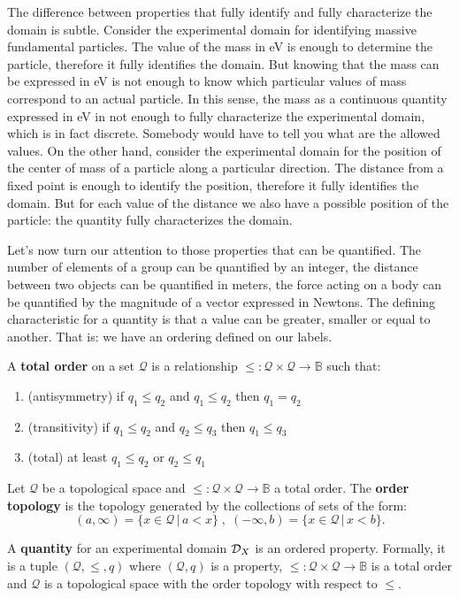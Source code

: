 \documentclass[11pt,letterpaper,fleqn]{memoir} %
\begin{document}
The difference between properties that fully identify and fully characterize the domain is subtle. Consider the experimental domain for identifying massive fundamental particles. The value of the mass in eV is enough to determine the particle, therefore it fully identifies the domain. But knowing that the mass can be expressed in eV is not enough to know which particular values of mass correspond to an actual particle. In this sense, the mass as a continuous quantity expressed in eV in not enough to fully characterize the experimental domain, which is in fact discrete. Somebody would have to tell you what are the allowed values. On the other hand, consider the experimental domain for the position of the center of mass of a particle along a particular direction. The distance from a fixed point is enough to identify the position, therefore it fully identifies the domain. But for each value of the distance we also have a possible position of the particle: the quantity fully characterizes the domain.

Let's now turn our attention to those properties that can be quantified. The number of elements of a group can be quantified by an integer, the distance between two objects can be quantified in meters, the force acting on a body can be quantified by the magnitude of a vector expressed in Newtons. The defining characteristic for a quantity is that a value can be greater, smaller or equal to another. That is: we have an ordering defined on our labels.
	
\begin{mathSection}
	\begin{defn}
		A \textbf{total order} on a set $\mathcal{Q}$ is a relationship $\leq : \mathcal{Q} \times \mathcal{Q} \to \mathbb{B}$ such that:
		\begin{enumerate}
			\item (antisymmetry) if $q_1 \leq q_2$ and $q_1 \leq q_2$ then $q_1 = q_2$
			\item (transitivity) if $q_1 \leq q_2$ and $q_2 \leq q_3$ then $q_1 \leq q_3$
			\item (total) at least $q_1 \leq q_2$ or $q_2 \leq q_1$
		\end{enumerate}
	\end{defn}
\begin{defn}
	Let $\mathcal{Q}$ be a topological space and $\leq : \mathcal{Q} \times \mathcal{Q} \to \mathbb{B}$ a total order. The \textbf{order topology} is the topology generated by the collections of sets of the form:
	$$(a, \infty) = \{x \in \mathcal{Q} \, | \, a < x\} \;,\; (-\infty, b) = \{x \in \mathcal{Q} \, | \, x < b\}.$$
\end{defn}
\begin{defn}
	A \textbf{quantity} for an experimental domain $\mathcal{D}_X$ is an ordered property. Formally, it is a tuple $(\mathcal{Q}, \leq, q)$ where $(\mathcal{Q}, q)$ is a property, $\leq : \mathcal{Q} \times \mathcal{Q} \to \mathbb{B}$ is a total order and $\mathcal{Q}$ is a topological space with the order topology with respect to $\leq$.
\end{defn}
\end{mathSection}
\end{document}
